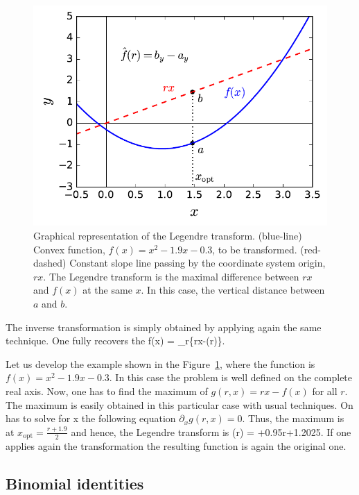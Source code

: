 \begin{figure}[htp]
  \centering
  \includegraphics[scale=.65]{img/AP_legendre.pdf}
  \caption[Graphical representation of the Legendre trasnform.]{Graphical representation of the Legendre transform. (blue-line) Convex function, $f(x)=x^2-1.9x-0.3$, to be transformed. (red-dashed) Constant slope line passing by the coordinate system origin, $rx$. The Legendre transform is the maximal difference between $rx$ and $f(x)$ at the same $x$. In this case, the vertical distance between $a$ and $b$.}
  \label{fig:lt-geometric-legendre}
\end{figure}

The inverse transformation is simply obtained by applying again the same technique.
One fully recovers the
\be
  f(x) = \max_{r}\{rx-(r)\}.
\ee

Let us develop the example shown in the Figure~\ref{fig:lt-geometric-legendre}, where the function is $f(x)=x^2-1.9x-0.3$.
In this case the problem is well defined on the complete real axis.
Now, one has to find the maximum of $g(r,x)=rx-f(x)$ for all $r$.
The maximum is easily obtained in this particular case with usual techniques.
On has to solve for x the following equation $\partial_x g(r,x) = 0$. Thus, the maximum is at $x_{\text{opt}} = \frac{r+1.9}{2}$ and hence, the Legendre transform is
\be
  (r) = +0.95r+1.2025.
\ee
If one applies again the transformation the resulting function is again the original one.

\subsection{Binomial identities}
\label{app:binomial-identities}

